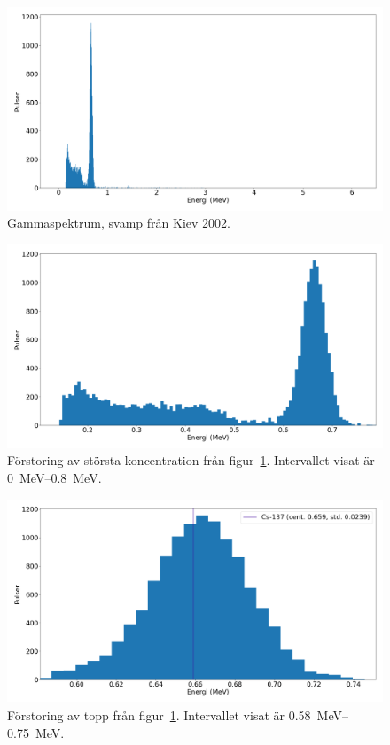 \begin{figure}[!ht]
    \centering
    \includegraphics[width=\textwidth, keepaspectratio]{../images/mushrooms.png}
    \caption{Gammaspektrum, svamp från Kiev 2002.}
    \label{fig:mushrooms}
\end{figure}

\begin{figure}[!ht]
    \centering
    \includegraphics[width=\textwidth, keepaspectratio]{../images/mushrooms_zoom.png}
    \caption{
        Förstoring av största koncentration från figur~\ref{fig:mushrooms}.
        Intervallet visat är \qtyrange{0}{0.8}{\MeV}.
    }
    \label{fig:mushroomszoom}
\end{figure}

\begin{figure}[!ht]
    \centering
    \includegraphics[width=\textwidth, keepaspectratio]{../images/mushrooms_top.png}
    \caption{
        Förstoring av topp från figur~\ref{fig:mushrooms}.
        Intervallet visat är \qtyrange{0.58}{0.75}{\MeV}.
    }
    \label{fig:mushroomstop}
\end{figure}

